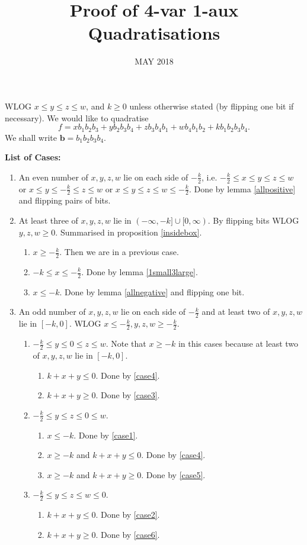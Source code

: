 \documentclass[11pt]{scrartcl}
\newcommand{\vc}[1]{\boldsymbol{#1}}
\begin{document}
\title{Proof of 4-var 1-aux Quadratisations} \date{MAY 2018}

WLOG $x \le y \le z \le w$, and  $k \ge 0$ unless otherwise stated (by flipping one bit if necessary). We would like to quadratise 
\[f = x b_1 b_2 b_3 + y b_2 b_3 b_4 + z b_3 b_4 b_1 + w b_4 b_1 b_2 + k b_1 b_2 b_3 b_4.\] We shall write $\vc b = b_1 b_2 b_3 b_4$.


{\LARGE \textbf{ List of Cases:}}
\begin{enumerate}
	\item An even number of $x, y, z, w$ lie on each side of $-\frac{k}{2}$, i.e. 
		$-\frac{k}{2} \le x \le y \le z \le w$ or $x \le y \le -\frac{k}{2} \le z \le w$ or 
		$x \le y \le z \le w \le -\frac{k}{2}$.
		Done by lemma \ref{allpositive} and flipping pairs of bits.
	\item At least three of $x, y, z, w$ lie in $(-\infty, -k] \cup [0, \infty)$. 
			By flipping bits WLOG $y, z, w \ge 0$. Summarised in proposition \ref{insidebox}.
		\begin{enumerate}
			\item $x \ge -\frac{k}{2}$. Then we are in a previous case.
			\item $-k \le x \le -\frac{k}{2}$. Done by lemma \ref{1small3large}.
			\item $x \le -k$. Done by lemma \ref{allnegative} and flipping one bit.
		\end{enumerate}
	\item An odd number of $x, y, z, w$ lie on each side of $-\frac{k}{2}$ and at least two of $x, y, z, w$ lie in $[-k, 0]$. 
		WLOG $x \le -\frac{k}{2}, y, z, w \ge -\frac{k}{2}$.
		\begin{enumerate}
			\item $-\frac{k}{2} \le y \le 0 \le z \le w$. Note that $x \ge -k$ in this cases 
				because at least two of $x, y, z, w$ lie in $[-k, 0]$.
				\begin{enumerate}
					\item $k+x+y \le 0$. Done by \ref{case4}.
					\item $k+x+y \ge 0$. Done by \ref{case3}.
				\end{enumerate}
			\item $-\frac{k}{2} \le y \le z \le 0 \le w$.
				\begin{enumerate}
					\item $x \le -k$. Done by \ref{case1}.
					\item $x \ge -k$ and $k+x+y \le 0$. Done by \ref{case4}.
					\item $x \ge -k$ and $k+x+y \ge 0$. Done by \ref{case5}.
				\end{enumerate}
			\item $-\frac{k}{2} \le y \le z \le w \le 0$.
				\begin{enumerate}
					\item $k+x+y \le 0$. Done by \ref{case2}.
					\item $k+x+y \ge 0$. Done by \ref{case6}.
				\end{enumerate}
		\end{enumerate}
\end{enumerate}
\end{document}
